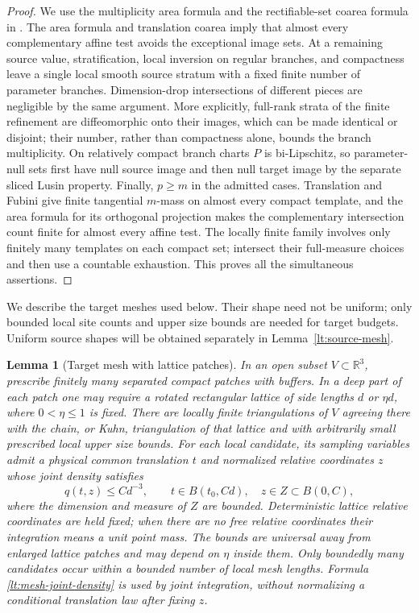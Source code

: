 \documentclass[11pt]{article}
\numberwithin{equation}{section}
\newtheorem{lemma}[theorem]{Lemma}
\theoremstyle{definition}
\theoremstyle{remark}
\begin{document}
\begin{proof}
We use the multiplicity area formula and the rectifiable-set coarea
formula in \cite[Chapter~2, Section~3, and Chapter~3, Section~2]{Simon2014Draft}.
The area formula and translation coarea imply that almost every
complementary affine test avoids the exceptional image sets.  At a
remaining source value, stratification, local inversion on regular
branches, and compactness leave a single local smooth source stratum
with a fixed finite number of parameter branches.  Dimension-drop
intersections of different pieces are negligible by the same argument.
More explicitly, full-rank strata of the finite refinement are
diffeomorphic onto their images, which can be made identical or
disjoint; their number, rather than compactness alone, bounds the
branch multiplicity. On relatively compact branch charts $P$ is
bi-Lipschitz, so parameter-null sets first have null source image and
then null target image by the separate sliced Lusin property.
Finally, $p\ge m$ in the admitted cases. Translation and Fubini give
finite tangential $m$-mass on almost every compact template, and the
area formula for its orthogonal projection makes the complementary
intersection count finite for almost every affine test.
The locally finite family involves only finitely many templates on
each compact set; intersect their full-measure choices and then use
a countable exhaustion.  This proves all the simultaneous assertions.
\end{proof}

We describe the target meshes used below.  Their shape need not be
uniform; only bounded local site counts and upper size bounds are
needed for target budgets.  Uniform source shapes will be obtained
separately in Lemma~\ref{lt:source-mesh}.

\begin{lemma}[Target mesh with lattice patches]
\label{lt:target-mesh}
In an open subset $V\subset\mathbb R^3$, prescribe finitely many separated
compact patches with buffers.  In a deep part of each patch one may
require a rotated rectangular lattice of side lengths $d$ or
$\eta d$, where $0<\eta\leq1$ is fixed.  There are locally finite
triangulations of $V$ agreeing there with the chain, or Kuhn,
triangulation of that lattice and with arbitrarily small prescribed
local upper size bounds.  For each local candidate, its sampling variables admit a physical
common translation $t$ and normalized relative coordinates $z$ whose
\emph{joint} density satisfies
\begin{equation}
 q(t,z)\leq Cd^{-3},\qquad
 t\in B(t_0,Cd),\quad z\in Z\subset B(0,C),
 \label{lt:mesh-joint-density}
\end{equation}
where the dimension and measure of $Z$ are bounded.  Deterministic
lattice relative coordinates are held fixed; when there are no free
relative coordinates their integration means a unit point mass.
The bounds are universal away from enlarged lattice patches and may
depend on $\eta$ inside them.  Only boundedly many candidates occur
within a bounded number of local mesh lengths.  Formula
\eqref{lt:mesh-joint-density} is used by joint integration, without
normalizing a conditional translation law after fixing $z$.
\end{lemma}
\end{document}
